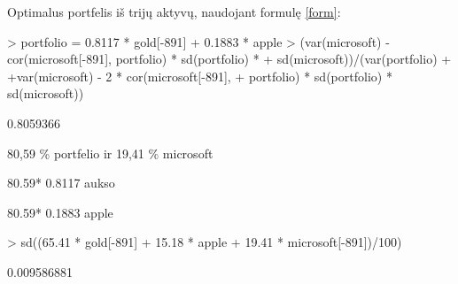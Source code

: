 \documentclass[12pt, a14paper, lithuanian]{article}
\begin{document}
\begin{comment}

 Apytikslės koeficientų reikšmės portfelyje iš dviejų įmonių



\begin{figure}[H]
  \centering
\texttt{[image: kursinis-028]}
  \caption{...}
  
\end{figure}

(gal nereikia)
Iliustracija: pagal grafikus rinktis ta skaiciu, ties kuriuo standartinis nuokrypis maziausias, ji istatyti vietoje i.

\textit{optimaliausias portfelis} = $imone1 \times i \times 0.1 + imone2 \times (1 - i\times 0.1)$ \\


$0.1 \times (i-1) \times Auksas + (1-0.1 \times (i-1)) \times Microsoft$

$0.1 \times (i-1) \times Apple + (1-0.1 \times (i-1)) \times Microsoft$

$0.1 \times (i-1) \times Apple + (1-0.1\times (i-1)) \times Auksas$

\end{comment}

Optimalus portfelis iš trijų aktyvų, naudojant formulę \eqref{form}:



\begin{Schunk}
\begin{Sinput}
> portfolio = 0.8117 * gold[-891] + 0.1883 * apple
> (var(microsoft) - cor(microsoft[-891], portfolio) * sd(portfolio) * 
+     sd(microsoft))/(var(portfolio) + +var(microsoft) - 2 * cor(microsoft[-891], 
+     portfolio) * sd(portfolio) * sd(microsoft))
\end{Sinput}
\begin{Soutput}
[1] 0.8059366
\end{Soutput}
\end{Schunk}

80,59 \% portfelio ir 19,41 \% microsoft

80.59* 0.8117 aukso

80.59* 0.1883 apple
\begin{Schunk}
\begin{Sinput}
> sd((65.41 * gold[-891] + 15.18 * apple + 19.41 * microsoft[-891])/100)
\end{Sinput}
\begin{Soutput}
[1] 0.009586881
\end{Soutput}
\end{Schunk}
\end{document}
